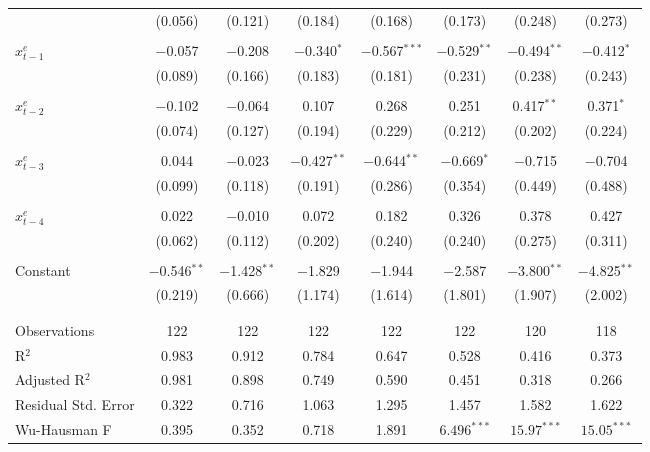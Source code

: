 \documentclass[11pt]{article}
\begin{document}
\begin{table}[!htbp]
\begin{threeparttable}
\begin{tabular}{@{\extracolsep{3pt}}lccccccc}
      & (0.056) & (0.121) & (0.184) & (0.168) & (0.173) & (0.248) & (0.273) \\ 
      & & & & & & & \\ 
      $x_{t-1}^e$ & $-$0.057 & $-$0.208 & $-$0.340$^{*}$ & $-$0.567$^{***}$ & $-$0.529$^{**}$ & $-$0.494$^{**}$ & $-$0.412$^{*}$ \\ 
      & (0.089) & (0.166) & (0.183) & (0.181) & (0.231) & (0.238) & (0.243) \\ 
      & & & & & & & \\ 
      $x_{t-2}^e$ & $-$0.102 & $-$0.064 & 0.107 & 0.268 & 0.251 & 0.417$^{**}$ & 0.371$^{*}$ \\ 
      & (0.074) & (0.127) & (0.194) & (0.229) & (0.212) & (0.202) & (0.224) \\ 
      & & & & & & & \\ 
      $x_{t-3}^e$  & 0.044 & $-$0.023 & $-$0.427$^{**}$ & $-$0.644$^{**}$ & $-$0.669$^{*}$ & $-$0.715 & $-$0.704 \\ 
      & (0.099) & (0.118) & (0.191) & (0.286) & (0.354) & (0.449) & (0.488) \\ 
      & & & & & & & \\ 
      $x_{t-4}^e$ & 0.022 & $-$0.010 & 0.072 & 0.182 & 0.326 & 0.378 & 0.427 \\ 
      & (0.062) & (0.112) & (0.202) & (0.240) & (0.240) & (0.275) & (0.311) \\ 
      & & & & & & & \\ 
    Constant & $-$0.546$^{**}$ & $-$1.428$^{**}$ & $-$1.829 & $-$1.944 & $-$2.587 & $-$3.800$^{**}$ & $-$4.825$^{**}$ \\ 
    & (0.219) & (0.666) & (1.174) & (1.614) & (1.801) & (1.907) & (2.002) \\ 
      & & & & & & & \\ 
      \hline \\[-1.8ex] 
      Observations & 122 & 122 & 122 & 122 & 122 & 120 & 118 \\ 
      R$^{2}$ & 0.983 & 0.912 & 0.784 & 0.647 & 0.528 & 0.416 & 0.373 \\ 
      Adjusted R$^{2}$ & 0.981 & 0.898 & 0.749 & 0.590 & 0.451 & 0.318 & 0.266 \\ 
      Residual Std. Error & 0.322 & 0.716 & 1.063 & 1.295 & 1.457 & 1.582 & 1.622 \\
      Wu-Hausman F& 0.395& 0.352& 0.718& 1.891& $6.496^{***}$ &$15.97^{***}$& $15.05^{***}$ \\
      \hline 
      \hline
      \end{tabular} 

\end{threeparttable}
\end{table}
\end{document}
